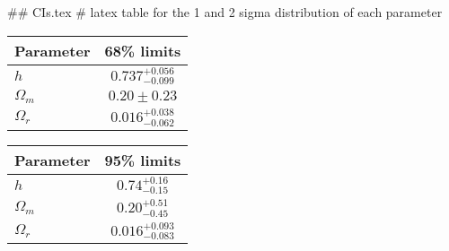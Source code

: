 ## CIs.tex
# latex table for the 1 and 2 sigma distribution of each parameter

\begin{tabular} { l  c}
 Parameter &  68\% limits\\
\hline
{\boldmath$h              $} & $0.737^{+0.056}_{-0.099}   $\\
{\boldmath$\Omega_m       $} & $0.20\pm 0.23              $\\
{\boldmath$\Omega_r       $} & $0.016^{+0.038}_{-0.062}   $\\
\hline
\end{tabular}

\begin{tabular} { l  c}
 Parameter &  95\% limits\\
\hline
{\boldmath$h              $} & $0.74^{+0.16}_{-0.15}      $\\
{\boldmath$\Omega_m       $} & $0.20^{+0.51}_{-0.45}      $\\
{\boldmath$\Omega_r       $} & $0.016^{+0.093}_{-0.083}   $\\
\hline
\end{tabular}
